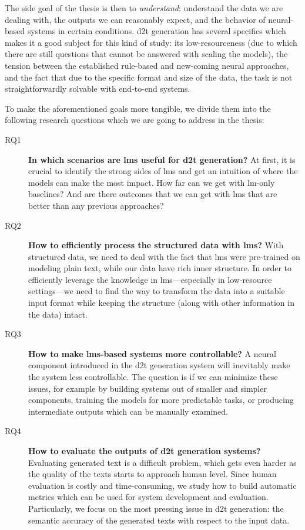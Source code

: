 The side goal of the thesis is then to \textit{understand}: understand the data we are dealing with, the outputs we can reasonably expect, and the behavior of neural-based systems in certain conditions. \ac{d2t} generation has several specifics which makes it a good subject for this kind of study: its low-resourceness (due to which there are still questions that cannot be answered with scaling the models), the tension between the established rule-based and new-coming neural approaches, and the fact that due to the specific format and size of the data, the task is not straightforwardly solvable with end-to-end systems.

To make the aforementioned goals more tangible, we divide them into the following research questions which we are going to address in the thesis:

\begin{description}
    \item[RQ1] \textbf{In which scenarios are \acp{lm} useful for \ac{d2t} generation?} At first, it is crucial to identify the strong sides of \acp{lm} and get an intuition of where the models can make the most impact. How far can we get with \ac{lm}-only baselines? And are there outcomes that we can get with \acp{lm} that are better than any previous approaches?
    \item[RQ2] \textbf{How to efficiently process the structured data with \acp{lm}?} With structured data, we need to deal with the fact that \acp{lm} were pre-trained on modeling plain text, while our data have rich inner structure. In order to efficiently leverage the knowledge in \acp{lm}---especially in low-resource settings---we need to find the way to transform the data into a suitable input format while keeping the structure (along with other information in the data) intact.
    \item[RQ3] \textbf{How to make \acp{lm}-based systems more controllable?} A neural component introduced in the \ac{d2t} generation system will inevitably make the system less controllable. The question is if we can minimize these issues, for example by building systems out of smaller and simpler components, training the models for more predictable tasks, or producing intermediate outputs which can be manually examined.
    \item[RQ4] \textbf{How to evaluate the outputs of \ac{d2t} generation systems?} Evaluating generated text is a difficult problem, which gets even harder as the quality of the texts starts to approach human level. Since human evaluation is costly and time-consuming, we study how to build automatic metrics which can be used for system development and evaluation. Particularly, we focus on the most pressing issue in \ac{d2t} generation: the semantic accuracy of the generated texts with respect to the input data.

\end{description}
